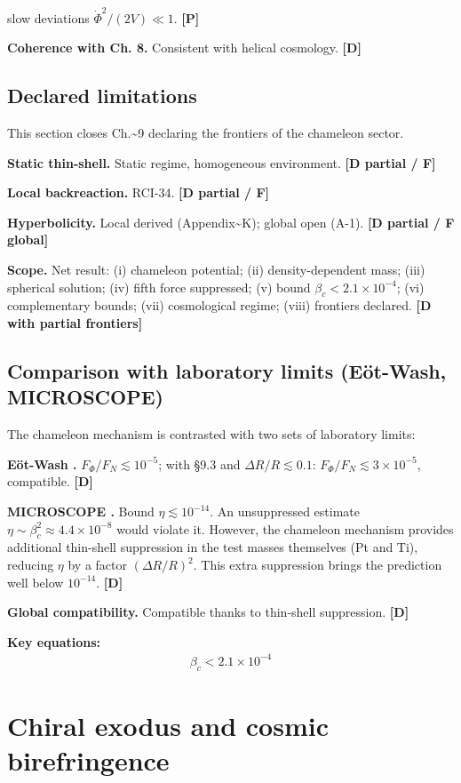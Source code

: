 ﻿\documentclass[11pt,letterpaper]{article}
\begin{document}
slow deviations $\dot\Phi^2/(2V) \ll 1$. \textbf{[P]}

\textbf{Coherence with Ch. 8.} Consistent with helical cosmology. \textbf{[D]}
\subsection{Declared limitations}
This section closes Ch.\textasciitilde{}9 declaring the frontiers of the chameleon sector.

\textbf{Static thin-shell.} Static regime, homogeneous environment. \textbf{[D partial / F]}

\textbf{Local backreaction.} RCI-34. \textbf{[D partial / F]}

\textbf{Hyperbolicity.} Local derived (Appendix\textasciitilde{}K); global open (A-1). \textbf{[D partial / F global]}

\textbf{Scope.} Net result: (i) chameleon potential; (ii) density-dependent mass; (iii) spherical solution; (iv) fifth force suppressed; (v) bound $\beta_c < 2{.}1 \times 10^{-4}$; (vi) complementary bounds; (vii) cosmological regime; (viii) frontiers declared. \textbf{[D with partial frontiers]}
\subsection{Comparison with laboratory limits (Eöt-Wash, MICROSCOPE)}
The chameleon mechanism is contrasted with two sets of laboratory limits:

\textbf{Eöt-Wash \cite{EotWash2015}.} $F_\Phi/F_N \lesssim 10^{-5}$; with §9.3 and $\Delta R/R \lesssim 0{.}1$: $F_\Phi/F_N \lesssim 3 \times 10^{-5}$, compatible. \textbf{[D]}

\textbf{MICROSCOPE \cite{PernotBorras2021}.} Bound $\eta \lesssim 10^{-14}$. An unsuppressed estimate $\eta \sim \beta_c^2 \approx 4{.}4 \times 10^{-8}$ would violate it. However, the chameleon mechanism provides additional thin-shell suppression in the test masses themselves (Pt and Ti), reducing $\eta$ by a factor $(\Delta R/R)^2$. This extra suppression brings the prediction well below $10^{-14}$. \textbf{[D]}

\textbf{Global compatibility.} Compatible thanks to thin-shell suppression. \textbf{[D]}

\textbf{Key equations:}
\begin{align*}
    \beta_c < 2.1\times 10^{-4}
\end{align*}
\section{Chiral exodus and cosmic birefringence}
\end{document}
